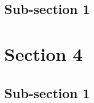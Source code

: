 \documentclass[../main.tex]{subfiles}
\begin{document}
\lipsum[1-2]


\subsection{Sub-section 1}

\lipsum[1-2]

\section{Section 4}

\lipsum[1-3]


\subsection{Sub-section 1}

\lipsum[2-3]
\end{document}
